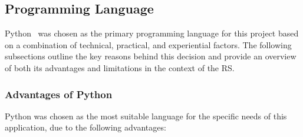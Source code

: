 \subsection{Programming Language}

Python~\cite{python} was chosen as the primary programming language for this project based on a combination of technical, practical, and experiential factors. The following subsections outline the key reasons behind this decision and provide an overview of both its advantages and limitations in the context of the RS.

\subsubsection{Advantages of Python}

Python was chosen as the most suitable language for the specific needs of this application, due to the following advantages:

